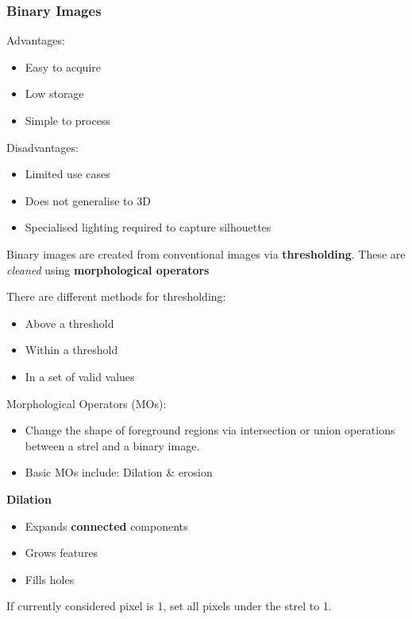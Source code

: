 \documentclass{beamer}
\begin{document}
  \begin{frame}[allowframebreaks]
    \frametitle{Binary Images}
    Advantages:
    \begin{itemize}
      \item Easy to acquire
      \item Low storage
      \item Simple to process
    \end{itemize}

    Disadvantages:
    \begin{itemize}
      \item Limited use cases
      \item Does not generalise to 3D
      \item Specialised lighting required to capture silhouettes
    \end{itemize}

    \framebreak

    Binary images are created from conventional images via \textbf{thresholding}. These are \textit{cleaned} using \textbf{morphological operators}

    There are different methods for thresholding:
    \begin{itemize}
      \item Above a threshold
      \item Within a threshold
      \item In a set of valid values
    \end{itemize}

  Morphological Operators (MOs):

  \begin{itemize}
    \item Change the shape of foreground regions via intersection or union operations between a strel and a binary image.
    \item Basic MOs include: Dilation \& erosion
  \end{itemize}
  \framebreak

  \textbf{Dilation}

  \begin{itemize}
    \item Expands \textbf{connected} components
    \item Grows features

    \item Fills holes
  \end{itemize}

  If currently considered pixel is 1, set all pixels under the strel to 1.


\end{frame}
\end{document}

